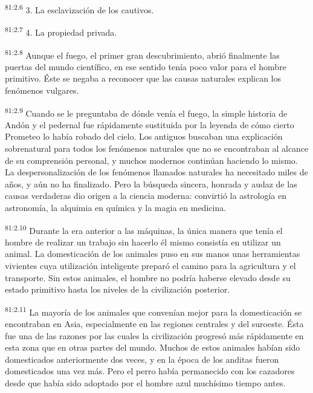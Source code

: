 \par
\textsuperscript{81:2.6} 3. La esclavización de los cautivos.

\par
\textsuperscript{81:2.7} 4. La propiedad privada.

\par
\textsuperscript{81:2.8} Aunque el fuego, el primer gran descubrimiento, abrió finalmente las puertas del mundo científico, en ese sentido tenía poco valor para el hombre primitivo. Éste se negaba a reconocer que las causas naturales explican los fenómenos vulgares.

\par
\textsuperscript{81:2.9} Cuando se le preguntaba de dónde venía el fuego, la simple historia de Andón y el pedernal fue rápidamente sustituida por la leyenda de cómo cierto Prometeo lo había robado del cielo. Los antiguos buscaban una explicación sobrenatural para todos los fenómenos naturales que no se encontraban al alcance de su comprensión personal, y muchos modernos continúan haciendo lo mismo. La despersonalización de los fenómenos llamados naturales ha necesitado miles de años, y aún no ha finalizado. Pero la búsqueda sincera, honrada y audaz de las causas verdaderas dio origen a la ciencia moderna: convirtió la astrología en astronomía, la alquimia en química y la magia en medicina.

\par
\textsuperscript{81:2.10} Durante la era anterior a las máquinas, la única manera que tenía el hombre de realizar un trabajo sin hacerlo él mismo consistía en utilizar un animal. La domesticación de los animales puso en sus manos unas herramientas vivientes cuya utilización inteligente preparó el camino para la agricultura y el transporte. Sin estos animales, el hombre no podría haberse elevado desde su estado primitivo hasta los niveles de la civilización posterior.

\par
\textsuperscript{81:2.11} La mayoría de los animales que convenían mejor para la domesticación se encontraban en Asia, especialmente en las regiones centrales y del suroeste. Ésta fue una de las razones por las cuales la civilización progresó más rápidamente en esta zona que en otras partes del mundo. Muchos de estos animales habían sido domesticados anteriormente dos veces, y en la época de los anditas fueron domesticados una vez más. Pero el perro había permanecido con los cazadores desde que había sido adoptado por el hombre azul muchísimo tiempo antes.

